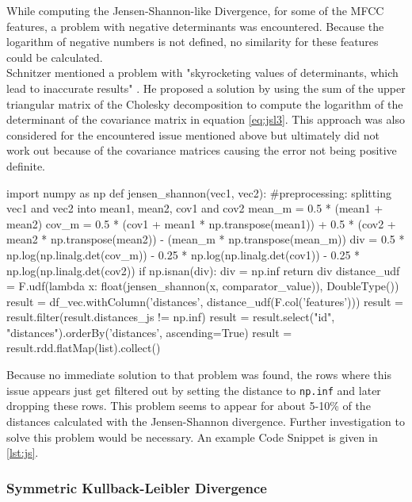 While computing the Jensen-Shannon-like Divergence, for some of the MFCC features, a problem with negative determinants was encountered. Because the logarithm of negative numbers is not defined, no similarity for these features could be calculated.\\ 
Schnitzer mentioned a problem with "skyrocketing values of determinants, which lead to inaccurate results" \cite[p.45]{schnitzer1}. He proposed a solution by using the sum of the upper triangular matrix of the Cholesky decomposition to compute the logarithm of the determinant of the covariance matrix in equation \ref{eq:jsl3}. 
This approach was also considered for the encountered issue mentioned above but ultimately did not work out because of the covariance matrices causing the error not being positive definite.\\

\begin{pythonCode}[frame=single,label={lst:js},caption={Jensen-Shannon-like Divergence},captionpos=b]
import numpy as np
def jensen_shannon(vec1, vec2):
	#preprocessing: splitting vec1 and vec2 into mean1, mean2, cov1 and cov2
	mean_m = 0.5 * (mean1 + mean2)
	cov_m = 0.5 * (cov1 + mean1 * np.transpose(mean1)) + 0.5 * 
		(cov2 + mean2 * np.transpose(mean2)) - (mean_m * np.transpose(mean_m))
	div = 0.5 * np.log(np.linalg.det(cov_m)) - 0.25 * np.log(np.linalg.det(cov1)) - 
		0.25 * np.log(np.linalg.det(cov2))  
	if np.isnan(div):
		div = np.inf
	return div
distance_udf = F.udf(lambda x: float(jensen_shannon(x, comparator_value)), 
	DoubleType())
result = df_vec.withColumn('distances', distance_udf(F.col('features')))
result = result.filter(result.distances_js != np.inf)    
result = result.select("id", "distances").orderBy('distances', ascending=True)
result = result.rdd.flatMap(list).collect()
\end{pythonCode}

\noindent Because no immediate solution to that problem was found, the rows where this issue appears just get filtered out by setting the distance to \lstinline{np.inf} and later dropping these rows. This problem seems to appear for about 5-10\% of the distances calculated with the Jensen-Shannon divergence. Further investigation to solve this problem would be necessary. An example Code Snippet is given in \ref{lst:js}.

\subsubsection{Symmetric Kullback-Leibler Divergence}\label{sparkskl}

